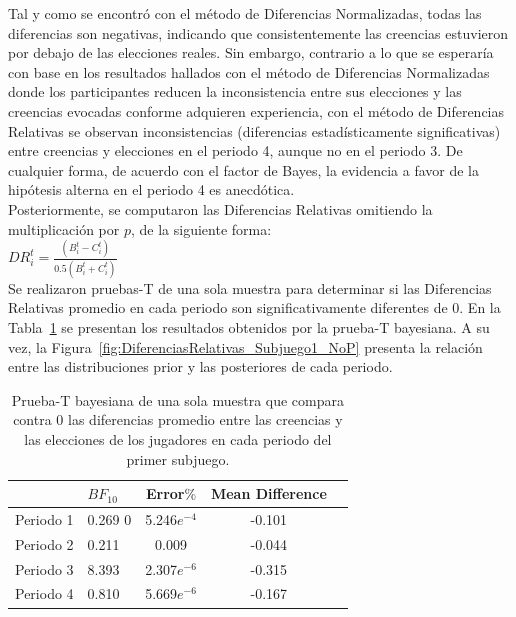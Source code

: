 Tal y como se encontró con el método de Diferencias Normalizadas, todas las diferencias son negativas, indicando que consistentemente las creencias estuvieron por debajo de las elecciones reales. Sin embargo, contrario a lo que se esperaría con base en los resultados hallados con el método de Diferencias Normalizadas donde los participantes reducen la inconsistencia entre sus elecciones y las creencias evocadas conforme adquieren experiencia, con el método de Diferencias Relativas se observan inconsistencias (diferencias estadísticamente significativas) entre creencias y elecciones en el periodo 4, aunque no en el periodo 3. De cualquier forma, de acuerdo con el factor de Bayes, la evidencia a favor de la hipótesis alterna en el periodo 4 es anecdótica.\\

Posteriormente, se computaron las Diferencias Relativas omitiendo la multiplicación por $p$, de la siguiente forma:\\

$DR_i^t = \frac{(B_i^t - C_i^t)}{0.5(B_i^t + C_i^t)}$\\

Se realizaron pruebas-T de una sola muestra para determinar si las Diferencias Relativas promedio en cada periodo son significativamente diferentes de 0. En la Tabla~\ref{DR_Sub1_NoP} se presentan los resultados obtenidos por la prueba-T bayesiana. A su vez, la Figura~\ref{fig:DiferenciasRelativas_Subjuego1_NoP} presenta la relación entre las distribuciones prior y las posteriores de cada periodo.


\begin{table}
\caption[Diferencias Relativas en el Subjuego 1 (sin multiplicar por $p$)]{Prueba-T bayesiana de una sola muestra que compara contra 0 las diferencias promedio entre las creencias y las elecciones de los jugadores en cada periodo del primer subjuego.}
\label{DR_Sub1_NoP}
\centering
\begin{tabular}{l l | c c c}  %
\toprule
\textbf{} & \textbf{$BF_{10}$} & \textbf{Error$\%$} & \textbf{Mean Difference}\\
\midrule
Periodo 1 & 0.269 0& 5.246$e^{-4}$ & -0.101 \\
Periodo 2 & 0.211 & 0.009 & -0.044 \\
Periodo 3 & 8.393 & 2.307$e^{-6}$ & -0.315 \\
Periodo 4 & 0.810 & 5.669$e^{-6}$ & -0.167 \\
\bottomrule
\end{tabular}
\end{table}


